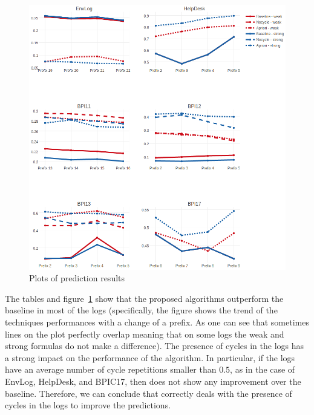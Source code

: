 \begin{figure}[!ht]
	\begin{center}  
		\includegraphics[width=\textwidth]{2_evaluation.png}
		\caption{Plots of prediction results}
		\label{figure:results}
	\end{center}
\end{figure}


The tables and figure~\ref{figure:results} show that the proposed algorithms outperform the baseline in most of the logs (specifically, the figure shows the trend of the techniques performances with a change of a prefix. As one can see that sometimes lines on the plot perfectly overlap meaning that on some logs the weak and strong formulas do not make a difference). The presence of cycles in the logs has a strong impact on the performance of the \nocycle algorithm. In particular, if the logs have an average number of cycle repetitions smaller than $0.5$, as in the case of EnvLog, HelpDesk, and BPIC17, then \nocycle does not show any improvement over the baseline. Therefore, we can conclude that \nocycle correctly deals with the presence of cycles in the logs to improve the predictions.





